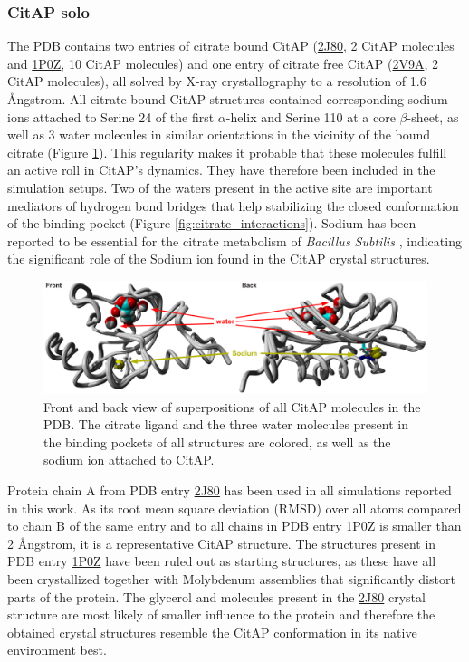 \documentclass[english, a4paper, 12pt, titlepage, draft]{article}
\newcommand{\PDB}[1]{\href{http://pdb.rcsb.org/pdb/explore/explore.do?structureId=#1}{#1}}
\begin{document}
\subsubsection{CitAP solo}

The PDB contains two entries of citrate bound CitAP (\PDB{2J80}, 2 CitAP molecules and \PDB{1P0Z}, 10 CitAP molecules) and one entry of citrate free CitAP (\PDB{2V9A}, 2 CitAP molecules), all solved by X-ray crystallography to a resolution of 1.6 \r{A}ngstrom.
All citrate bound CitAP structures contained corresponding sodium ions attached to Serine 24 of the first $\alpha$-helix and Serine 110 at a core $\beta$-sheet, as well as 3 water molecules in similar orientations in the vicinity of the bound citrate (Figure \ref{fig:CitAP_waterNA}).
This regularity makes it probable that these molecules fulfill an active roll in CitAP's dynamics.
They have therefore been included in the simulation setups.
Two of the waters present in the active site are important mediators of hydrogen bond bridges that help stabilizing the closed conformation of the binding pocket (Figure \ref{fig:citrate_interactions}).
Sodium has been reported to be essential for the citrate metabolism of \emph{Bacillus Subtilis} \cite{CitA_NA}, indicating the significant role of the Sodium ion found in the CitAP crystal structures.

\begin{figure}
    \centering
    \includegraphics[width=1.0\textwidth]{figures/CitAP_PDB_structures/CitAP_PDB_structures.pdf}
    \caption{Front and back view of superpositions of all CitAP molecules in the PDB. The citrate ligand and the three water molecules present in the binding pockets of all structures are colored, as well as the sodium ion attached to CitAP.}
    \label{fig:CitAP_waterNA}
\end{figure}       

Protein chain A from PDB entry \PDB{2J80} has been used in all simulations reported in this work.
As its root mean square deviation (RMSD) over all  atoms compared to chain B of the same entry and to all chains in PDB entry \PDB{1P0Z} is smaller than 2 \r{A}ngstrom, it is a representative CitAP structure.
The structures present in PDB entry \PDB{1P0Z} have been ruled out as starting structures, as these have all been crystallized together with Molybdenum assemblies that significantly distort parts of the protein.
The glycerol and  molecules present in the \PDB{2J80} crystal structure are most likely of smaller influence to the protein and therefore the obtained crystal structures resemble the CitAP conformation in its native environment best.
\end{document}
